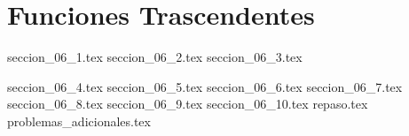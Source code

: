 
\chapter{Funciones Trascendentes}

{seccion_06_1.tex}
{seccion_06_2.tex}
{seccion_06_3.tex}

{seccion_06_4.tex}
{seccion_06_5.tex}
{seccion_06_6.tex}
{seccion_06_7.tex}
{seccion_06_8.tex}
{seccion_06_9.tex}
{seccion_06_10.tex}
{repaso.tex}
{problemas_adicionales.tex}

